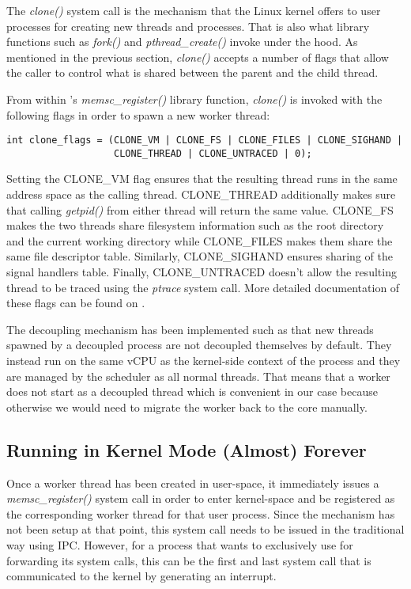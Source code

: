 The \emph{clone()} system call is the mechanism that the Linux kernel offers to
user processes for creating new threads and processes. That is also what
library functions such as \emph{fork()} and \emph{pthread\_create()} invoke under
the hood. As mentioned in the previous section, \emph{clone()} accepts a number
of flags that allow the caller to control what is shared between the parent and
the child thread.

From within \lib's \emph{memsc\_register()} library function, \emph{clone()} is
invoked with the following flags in order to spawn a new \memsc worker thread:

\begin{verbatim}
int clone_flags = (CLONE_VM | CLONE_FS | CLONE_FILES | CLONE_SIGHAND |
                   CLONE_THREAD | CLONE_UNTRACED | 0);
\end{verbatim}

Setting the CLONE\_VM flag ensures that the resulting thread runs in the same
address space as the calling thread. CLONE\_THREAD additionally makes sure that
calling \emph{getpid()} from either thread will return the same value.
CLONE\_FS makes the two threads share filesystem information such as the root
directory and the current working directory while CLONE\_FILES makes them share
the same file descriptor table. Similarly, CLONE\_SIGHAND ensures sharing of
the signal handlers table. Finally, CLONE\_UNTRACED doesn't allow the resulting
thread to be traced using the \emph{ptrace} system call. More detailed
documentation of these flags can be found on \cite{clone}.

The decoupling mechanism has been implemented such as that new threads spawned
by a decoupled process are not decoupled themselves by default. They instead
run on the same vCPU as the kernel-side context of the process and they are
managed by the \llinux scheduler as all normal \llinux threads. That means that
a \memsc worker does not start as a decoupled thread which is convenient in our
case because otherwise we would need to migrate the worker back to the \llinux
core manually.

\subsection{Running in Kernel Mode (Almost) Forever}
\label{section:kermode}

Once a \memsc worker thread has been created in user-space, it immediately
issues a \emph{memsc\_register()} system call in order to enter kernel-space
and be registered as the corresponding worker thread for that user process.
Since the \memsc mechanism has not been setup at that point, this system call
needs to be issued in the traditional way using IPC.  However, for a process
that wants to exclusively use \memsc for forwarding its system calls, this can
be the first and last system call that is communicated to the \llinux kernel by
generating an interrupt.

